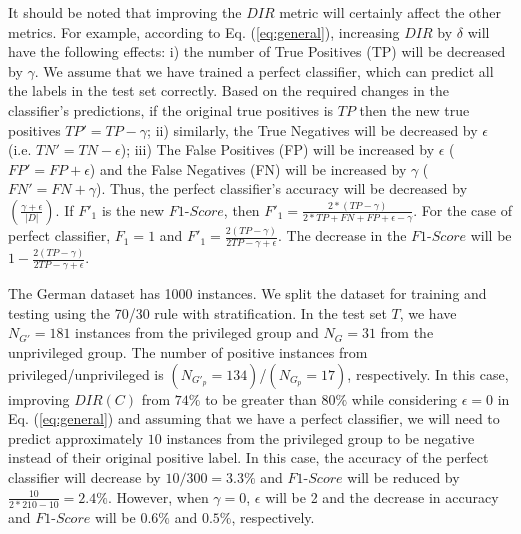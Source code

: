 It should be noted that improving the $DIR$ metric will certainly affect the other metrics. For example, according to Eq. (\ref{eq:general}), increasing $DIR$ by $\delta$ will have the following effects: i) the number of True Positives (TP) will be decreased by $\gamma$. We assume that we have trained a perfect classifier, which can predict all the labels in the test set correctly. Based on the required changes in the classifier's predictions, if the original true positives is $TP$ then the new true positives $TP'= TP - \gamma$; ii) similarly, the True Negatives will be decreased by $\epsilon$ (i.e. $TN'= TN -\epsilon$); iii) The False Positives (FP) will be increased by $\epsilon$ ($FP'= FP + \epsilon$) and the False Negatives (FN) will be increased by $\gamma$ ($FN'= FN + \gamma$). Thus, the perfect classifier's accuracy will be decreased by $\left(\frac{\gamma+\epsilon}{|D|}\right)$. If $F'_1$ is the new $F1\text{-}Score$, then $F'_1 = \frac{2*(TP-\gamma)}{2*TP+FN+FP+\epsilon-\gamma}$. For the case of perfect classifier, $F_1 = 1$ and $F'_1 = \frac{2(TP-\gamma)}{2TP -\gamma+\epsilon}$. The decrease in the $F1\text{-}Score$ will be $1 - \frac{2(TP-\gamma)}{2TP -\gamma+\epsilon}$.

\begin{example}
\noindent The German dataset \cite{UCIdfs} has 1000 instances. We split the dataset for training and testing using the 70/30 rule with stratification. In the test set $T$, we have $N_{G'} = 181$ instances from the privileged group and $N_G = 31$ from the unprivileged group. The number of positive instances from privileged/unprivileged is $(N_{G'_p} = 134)$/$(N_{G_p} = 17)$, respectively. In this case, improving $DIR(C)$ from $74\%$ to be greater than $80\%$ while considering $\epsilon = 0$ in Eq. (\ref{eq:general}) and assuming that we have a perfect classifier, we will need to predict approximately $10$ instances from the privileged group to be negative instead of their original positive label. In this case, the accuracy of the perfect classifier will decrease by $10/300 = 3.3\%$ and $F1\text{-}Score$ will be reduced by $\frac{10}{2*210-10}= 2.4\%$. However, when $\gamma = 0$, $\epsilon$ will be 2 and the decrease in accuracy and $F1\text{-}Score$ will be $0.6\%$ and $0.5\%$, respectively.
\end{example}

